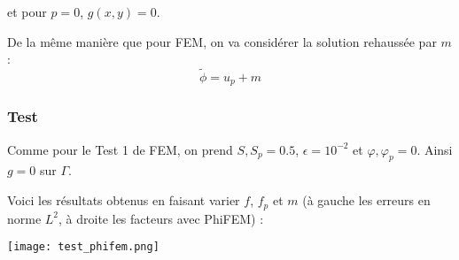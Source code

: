 et pour $p=0$, $g(x,y)=0$.

De la même manière que pour FEM, on va considérer la solution rehaussée par $m$ :
$$\tilde{\phi}=u_p+m$$

\subsubsection*{Test}

Comme pour le Test 1 de FEM, on prend $S,S_p=0.5$, $\epsilon=10^{-2}$ et $\varphi,\varphi_p=0$. Ainsi $g=0$ sur $\Gamma$. 

Voici les résultats obtenus en faisant varier $f$, $f_p$ et $m$ (à gauche les erreurs en norme $L^2$, à droite les facteurs avec PhiFEM) :

\begin{minipage}{\linewidth}
	\centering
	\texttt{[image: test\_phifem.png]}
\end{minipage}

